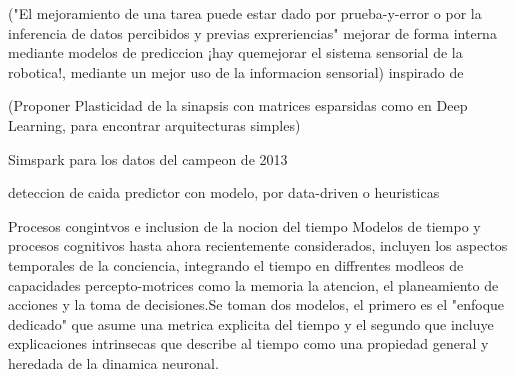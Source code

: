 



 ("El mejoramiento de una tarea puede estar dado por prueba-y-error o por la inferencia de datos percibidos y previas expreriencias" mejorar de forma interna mediante modelos de prediccion ¡hay quemejorar el sistema sensorial de la robotica!, mediante un mejor uso de la informacion sensorial) inspirado de \cite{Andre2015}

(Proponer Plasticidad de la sinapsis con matrices esparsidas como en Deep Learning, para encontrar arquitecturas simples) \cite{Steingrube2011}

 Simspark para los datos del campeon de 2013 \cite{Shafii2015}

deteccion de caida predictor con modelo, por data-driven o heuristicas \cite{Paiman2016}

Procesos congintvos e inclusion de la nocion del tiempo\cite{Maniadakis2014}
 Modelos de tiempo y procesos cognitivos hasta ahora recientemente considerados, incluyen los aspectos temporales de la conciencia, integrando el tiempo en diffrentes modleos de capacidades percepto-motrices como la memoria la atencion, el planeamiento de acciones y la toma de decisiones.Se toman dos modelos, el primero es el "enfoque dedicado" que asume una metrica explicita del tiempo y el segundo que incluye explicaciones intrinsecas que describe al tiempo como una propiedad general y heredada de la dinamica neuronal.

